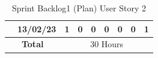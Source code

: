 \documentclass[12pt]{report}
\begin{document}
\begin{table}[h]
{\begin{tabular}{|cc|ccccccc|}
\rowcolor[HTML]{FFFFFF} 
\multicolumn{1}{|c|}{\cellcolor[HTML]{FFFFFF}\textbf{Testing}}                                                   & 13/02/23                                                           & \multicolumn{1}{c|}{\cellcolor[HTML]{FFFFFF}1}                                                                    & \multicolumn{1}{c|}{\cellcolor[HTML]{FFFFFF}0}                                                                 & \multicolumn{1}{c|}{\cellcolor[HTML]{FFFFFF}0}                                                                 & \multicolumn{1}{c|}{\cellcolor[HTML]{FFFFFF}0}                                                                  & \multicolumn{1}{c|}{\cellcolor[HTML]{FFFFFF}0}                                                                  & \multicolumn{1}{c|}{\cellcolor[HTML]{FFFFFF}0}                                                                  & \cellcolor[HTML]{FFFFFF}1                                          \\ \hline
\multicolumn{2}{|c|}{\textbf{Total}}                                                                                                                                                  & \multicolumn{7}{c|}{30   Hours}                                                                                                                                                                                                                                                                                                                                                                                                                                                                                                                                                                                                                                                                                                                                                \\ \hline
\end{tabular}
}
\caption{Sprint Backlog1 (Plan) User Story 2}
\label{tab:mytable}
\end{table}
\end{document}
